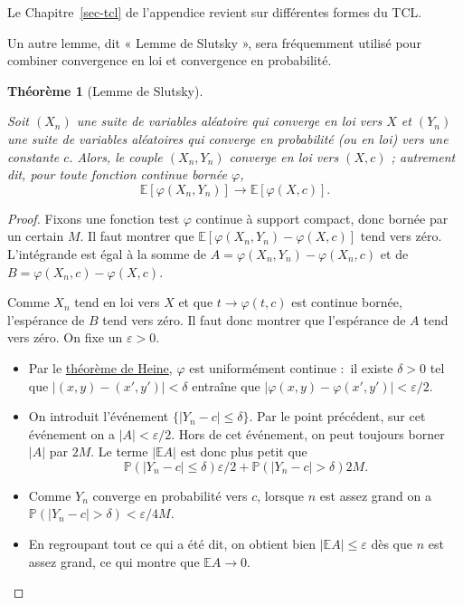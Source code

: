 \documentclass[
  10,
  letterpaper,
  DIV=11,
  numbers=noendperiod]{scrreport}
\providecommand{\tightlist}{%
  \setlength{\itemsep}{0pt}\setlength{\parskip}{0pt}}\usepackage{longtable,booktabs,array}
\theoremstyle{plain}
\newtheorem{theorem}{Théorème}[chapter]
\theoremstyle{definition}
\theoremstyle{plain}
\theoremstyle{definition}
\theoremstyle{definition}
\theoremstyle{plain}
\theoremstyle{remark}
\begin{document}
Le Chapitre~\ref{sec-tcl} de l'appendice revient sur différentes formes
du TCL.

Un autre lemme, dit « Lemme de Slutsky », sera fréquemment utilisé pour
combiner convergence en loi et convergence en probabilité.

\begin{theorem}[Lemme de
Slutsky]\protect\hypertarget{thm-slutsky}{}\label{thm-slutsky}

Soit \((X_n)\) une suite de variables aléatoire qui converge en loi vers
\(X\) et \((Y_n)\) une suite de variables aléatoires qui converge en
probabilité (ou en loi) vers une constante \(c\). Alors, le
\emph{couple} \((X_n, Y_n)\) converge en loi vers \((X,c)\) ; autrement
dit, pour toute fonction continue bornée \(\varphi\),
\[\mathbb{E}[\varphi(X_n, Y_n)] \to \mathbb{E}[\varphi(X,c)].\]

\end{theorem}

\begin{proof}

Fixons une fonction test \(\varphi\) continue à support compact, donc
bornée par un certain \(M\). Il faut montrer que
\(\mathbb{E}[\varphi(X_n, Y_n) - \varphi(X,c)]\) tend vers zéro.
L'intégrande est égal à la somme de
\(A = \varphi(X_n, Y_n) - \varphi(X_n, c)\) et de
\(B=\varphi(X_n, c) - \varphi(X, c)\).

Comme \(X_n\) tend en loi vers \(X\) et que \(t\to \varphi(t,c)\) est
continue bornée, l'espérance de \(B\) tend vers zéro. Il faut donc
montrer que l'espérance de \(A\) tend vers zéro. On fixe un
\(\varepsilon>0\).

\begin{itemize}
\tightlist
\item
  Par le
  \href{https://fr.wikipedia.org/wiki/Th\%C3\%A9or\%C3\%A8me_de_Heine}{théorème
  de Heine}, \(\varphi\) est uniformément continue :~il existe
  \(\delta>0\) tel que \(|(x,y) - (x', y')|<\delta\) entraîne que
  \(|\varphi(x,y) - \varphi(x', y')|< \varepsilon/2\).
\item
  On introduit l'événement \(\{|Y_n - c|\leqslant \delta\}\). Par le
  point précédent, sur cet événement on a \(|A| < \varepsilon/2\). Hors
  de cet événement, on peut toujours borner \(|A|\) par \(2M\). Le terme
  \(|\mathbb{E}A|\) est donc plus petit que
  \[\mathbb{P}(|Y_n - c|\leqslant \delta)\varepsilon/2 +  \mathbb{P}(|Y_n - c| > \delta)2M.\]
\item
  Comme \(Y_n\) converge en probabilité vers \(c\), lorsque \(n\) est
  assez grand on a \(\mathbb{P}(|Y_n - c| > \delta) < \varepsilon/4M\).
\item
  En regroupant tout ce qui a été dit, on obtient bien
  \(|\mathbb{E}A| \leqslant \varepsilon\) dès que \(n\) est assez grand,
  ce qui montre que \(\mathbb{E}A \to 0\).\\
\end{itemize}

\end{proof}
\end{document}

